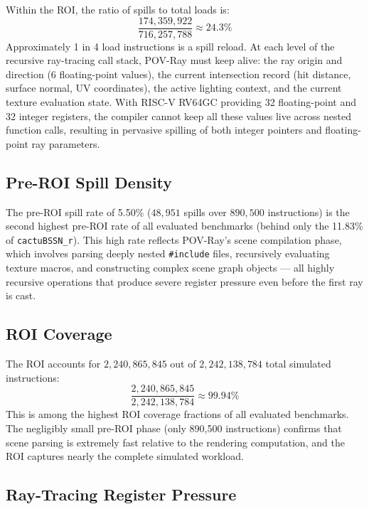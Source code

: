\documentclass[conference]{IEEEtran}
\begin{document}
Within the ROI, the ratio of spills to total loads is:
\[
\frac{174{,}359{,}922}{716{,}257{,}788} \approx 24.3\%
\]
Approximately 1 in 4 load instructions is a spill reload. At each
level of the recursive ray-tracing call stack, POV-Ray must keep alive:
the ray origin and direction (6 floating-point values), the current
intersection record (hit distance, surface normal, UV coordinates),
the active lighting context, and the current texture evaluation state.
With RISC-V RV64GC providing 32 floating-point and 32 integer
registers, the compiler cannot keep all these values live across
nested function calls, resulting in pervasive spilling of both
integer pointers and floating-point ray parameters.

\subsection{Pre-ROI Spill Density}

The pre-ROI spill rate of 5.50\% ($48{,}951$ spills over $890{,}500$
instructions) is the second highest pre-ROI rate of all evaluated
benchmarks (behind only the 11.83\% of \texttt{cactuBSSN\_r}).
This high rate reflects POV-Ray's scene compilation phase, which
involves parsing deeply nested \texttt{\#include} files, recursively
evaluating texture macros, and constructing complex scene graph
objects — all highly recursive operations that produce severe
register pressure even before the first ray is cast.

\subsection{ROI Coverage}

The ROI accounts for $2{,}240{,}865{,}845$ out of $2{,}242{,}138{,}784$
total simulated instructions:
\[
\frac{2{,}240{,}865{,}845}{2{,}242{,}138{,}784} \approx 99.94\%
\]
This is among the highest ROI coverage fractions of all evaluated
benchmarks. The negligibly small pre-ROI phase (only 890,500
instructions) confirms that scene parsing is extremely fast relative
to the rendering computation, and the ROI captures nearly the
complete simulated workload.

\subsection{Ray-Tracing Register Pressure}
\end{document}
